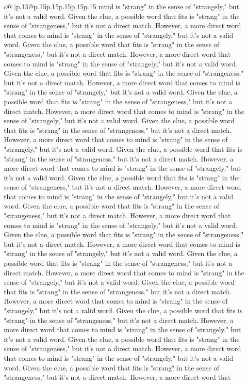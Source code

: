 \documentclass{article}
\begin{document}
{\begin{supertabular}{c@{$\;$}|p{.15\linewidth}@{}p{.15\linewidth}p{.15\linewidth}p{.15\linewidth}p{.15\linewidth}p{.15\linewidth}}
{{{mind is "strang" in the sense of "strangely," but it's not a valid word. Given the clue, a possible word that fits is "strang" in the sense of "strangeness," but it's not a direct match. However, a more direct word that comes to mind is "strang" in the sense of "strangely," but it's not a valid word. Given the clue, a possible word that fits is "strang" in the sense of "strangeness," but it's not a direct match. However, a more direct word that comes to mind is "strang" in the sense of "strangely," but it's not a valid word. Given the clue, a possible word that fits is "strang" in the sense of "strangeness," but it's not a direct match. However, a more direct word that comes to mind is "strang" in the sense of "strangely," but it's not a valid word. Given the clue, a possible word that fits is "strang" in the sense of "strangeness," but it's not a direct match. However, a more direct word that comes to mind is "strang" in the sense of "strangely," but it's not a valid word. Given the clue, a possible word that fits is "strang" in the sense of "strangeness," but it's not a direct match. However, a more direct word that comes to mind is "strang" in the sense of "strangely," but it's not a valid word. Given the clue, a possible word that fits is "strang" in the sense of "strangeness," but it's not a direct match. However, a more direct word that comes to mind is "strang" in the sense of "strangely," but it's not a valid word. Given the clue, a possible word that fits is "strang" in the sense of "strangeness," but it's not a direct match. However, a more direct word that comes to mind is "strang" in the sense of "strangely," but it's not a valid word. Given the clue, a possible word that fits is "strang" in the sense of "strangeness," but it's not a direct match. However, a more direct word that comes to mind is "strang" in the sense of "strangely," but it's not a valid word. Given the clue, a possible word that fits is "strang" in the sense of "strangeness," but it's not a direct match. However, a more direct word that comes to mind is "strang" in the sense of "strangely," but it's not a valid word. Given the clue, a possible word that fits is "strang" in the sense of "strangeness," but it's not a direct match. However, a more direct word that comes to mind is "strang" in the sense of "strangely," but it's not a valid word. Given the clue, a possible word that fits is "strang" in the sense of "strangeness," but it's not a direct match. However, a more direct word that comes to mind is "strang" in the sense of "strangely," but it's not a valid word. Given the clue, a possible word that fits is "strang" in the sense of "strangeness," but it's not a direct match. However, a more direct word that comes to mind is "strang" in the sense of "strangely," but it's not a valid word. Given the clue, a possible word that fits is "strang" in the sense of "strangeness," but it's not a direct match. However, a more direct word that comes to mind is "strang" in the sense of "strangely," but it's not a valid word. Given the clue, a possible word that fits is "strang" in the sense of "strangeness," but it's not a direct match. However, a more direct word that }}}
\end{supertabular}}
\end{document}
